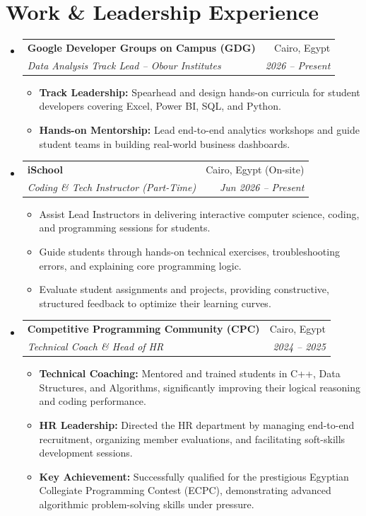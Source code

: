 \documentclass[letterpaper,11pt]{article}
\makeatletter
\newcommand{\resumeItem}[1]{
  \item\small{
    {#1 \vspace{-2pt}}
  }
}
\newcommand{\resumeSubheading}[4]{
  \vspace{-2pt}\item
    \begin{tabular*}{0.97\textwidth}[t]{l@{\extracolsep{\fill}}r}
      \textbf{#1} & #2 \\
      \textit{\small#3} & \textit{\small #4} \\
    \end{tabular*}\vspace{-7pt}
}
\newcommand{\resumeSubHeadingListStart}{\begin{itemize}[leftmargin=0.15in, label={}]}
\newcommand{\resumeSubHeadingListEnd}{\end{itemize}}
\newcommand{\resumeItemListStart}{\begin{itemize}}
\newcommand{\resumeItemListEnd}{\end{itemize}\vspace{-5pt}}
\makeatother
\begin{document}
\section{Work \& Leadership Experience}
  \resumeSubHeadingListStart

    \resumeSubheading
      {Google Developer Groups on Campus (GDG)}{Cairo, Egypt}
      {Data Analysis Track Lead -- Obour Institutes}{2026 -- Present}
      \resumeItemListStart
        \resumeItem{\textbf{Track Leadership:} Spearhead and design hands-on curricula for student developers covering Excel, Power BI, SQL, and Python.}
        \resumeItem{\textbf{Hands-on Mentorship:} Lead end-to-end analytics workshops and guide student teams in building real-world business dashboards.}
      \resumeItemListEnd

    \resumeSubheading
      {iSchool}{Cairo, Egypt (On-site)}
      {Coding \& Tech Instructor (Part-Time)}{Jun 2026 -- Present}
      \resumeItemListStart
        \resumeItem{Assist Lead Instructors in delivering interactive computer science, coding, and programming sessions for students.}
        \resumeItem{Guide students through hands-on technical exercises, troubleshooting errors, and explaining core programming logic.}
        \resumeItem{Evaluate student assignments and projects, providing constructive, structured feedback to optimize their learning curves.}
      \resumeItemListEnd

    \resumeSubheading
      {Competitive Programming Community (CPC)}{Cairo, Egypt}
      {Technical Coach \& Head of HR}{2024 -- 2025}
      \resumeItemListStart
        \resumeItem{\textbf{Technical Coaching:} Mentored and trained students in C++, Data Structures, and Algorithms, significantly improving their logical reasoning and coding performance.}
        \resumeItem{\textbf{HR Leadership:} Directed the HR department by managing end-to-end recruitment, organizing member evaluations, and facilitating soft-skills development sessions.}
        \resumeItem{\textbf{Key Achievement:} Successfully qualified for the prestigious Egyptian Collegiate Programming Contest (ECPC), demonstrating advanced algorithmic problem-solving skills under pressure.}
      \resumeItemListEnd

  \resumeSubHeadingListEnd


\end{document}
